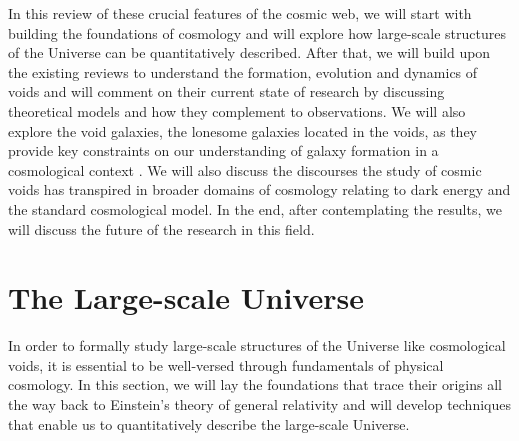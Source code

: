 \documentclass[fleqn,usenatbib]{mnras}
\begin{document}
In this review of these crucial features of the cosmic web, we will start with building the foundations of cosmology and will explore how large-scale structures of the Universe can be quantitatively described. After that, we will build upon the existing reviews \citep{van_de_weygaert_cosmic_2011, van_de_weygaert_voids_2014} to understand the formation, evolution and dynamics of voids and will comment on their current state of research by discussing theoretical models and how they complement to observations. We will also explore the void galaxies, the lonesome galaxies located in the voids, as they provide key constraints on our understanding of galaxy formation in a cosmological context \citep{kreckel_void_2014}. We will also discuss the discourses the study of cosmic voids has transpired in broader domains of cosmology relating to dark energy and the standard cosmological model. In the end, after contemplating the results, we will discuss the future of the research in this field.
%

\section{The Large-scale Universe}
In order to formally study large-scale structures of the Universe like cosmological voids, it is essential to be well-versed through fundamentals of physical cosmology. In this section, we will lay the foundations that trace their origins all the way back to Einstein's theory of general relativity and will develop techniques that enable us to quantitatively describe the large-scale Universe. 
\end{document}
